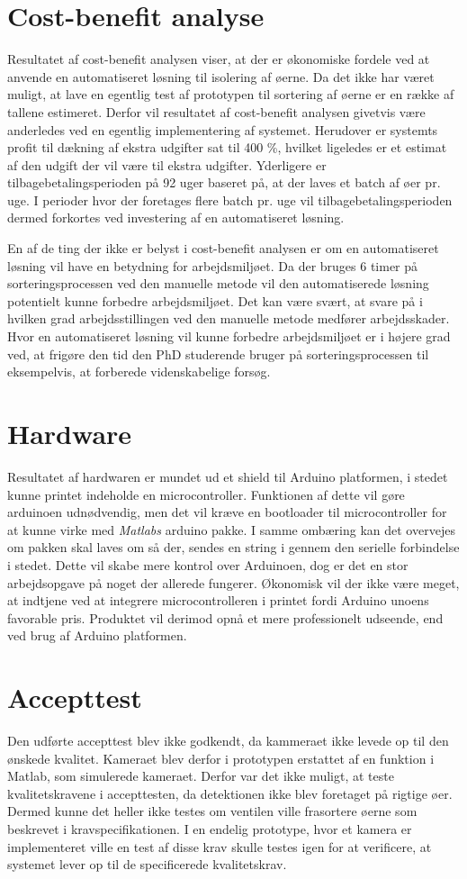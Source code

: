 \section{Cost-benefit analyse}
Resultatet af cost-benefit analysen viser, at der er økonomiske fordele ved at anvende en automatiseret løsning til isolering af øerne. Da det ikke har været muligt, at lave en egentlig test af prototypen til sortering af øerne er en række af tallene estimeret. Derfor vil resultatet af cost-benefit analysen givetvis være anderledes ved en egentlig implementering af systemet. Herudover er systemts profit til dækning af ekstra udgifter sat til 400 \%, hvilket ligeledes er et estimat af den udgift der vil være til ekstra udgifter. Yderligere er tilbagebetalingsperioden på 92 uger baseret på, at der laves et batch af øer pr. uge. I perioder hvor der foretages flere batch pr. uge vil tilbagebetalingsperioden dermed forkortes ved investering af en automatiseret løsning.

En af de ting der ikke er belyst i cost-benefit analysen er om en automatiseret løsning vil have en betydning for arbejdsmiljøet. Da der bruges 6 timer på sorteringsprocessen ved den manuelle metode vil den automatiserede løsning potentielt kunne forbedre arbejdsmiljøet. Det kan være svært, at svare på i hvilken grad arbejdsstillingen ved den manuelle metode medfører arbejdsskader. Hvor en automatiseret løsning vil kunne forbedre arbejdsmiljøet er i højere grad ved, at frigøre den tid den PhD studerende bruger på sorteringsprocessen til eksempelvis, at forberede videnskabelige forsøg.

\section{Hardware}
Resultatet af hardwaren er mundet ud et shield til Arduino platformen, i stedet kunne printet indeholde en microcontroller. Funktionen af dette vil gøre arduinoen udnødvendig, men det vil kræve en bootloader til microcontroller for at kunne virke med \textit{Matlabs} arduino pakke. I samme ombæring kan det overvejes om pakken skal laves om så der, sendes en string i gennem den serielle forbindelse i stedet. Dette vil skabe mere kontrol over Arduinoen, dog er det en stor arbejdsopgave på noget der allerede fungerer. Økonomisk vil der ikke være meget, at indtjene ved at integrere microcontrolleren i printet fordi Arduino unoens favorable pris. Produktet vil derimod opnå et mere professionelt udseende, end ved brug af Arduino platformen.

\section{Accepttest}
Den udførte accepttest blev ikke godkendt, da kammeraet ikke levede op til den ønskede kvalitet. Kameraet blev derfor i prototypen erstattet af en funktion i Matlab, som simulerede kameraet. Derfor var det ikke muligt, at teste kvalitetskravene i accepttesten, da detektionen ikke blev foretaget på rigtige øer. Dermed kunne det heller ikke testes om ventilen ville frasortere øerne som beskrevet i kravspecifikationen. I en endelig prototype, hvor et kamera er implementeret ville en test af disse krav skulle testes igen for at verificere, at systemet lever op til de specificerede kvalitetskrav. 